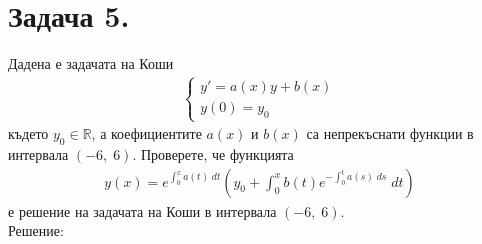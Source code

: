 \documentclass[a4paper, 12pt, oneside]{article}
\newcommand{\R}{\mathbb{R}}
\begin{document}
\section{Задача 5.}
Дадена е задачата на Коши
\begin{align*}
    \begin{cases}
        y' = a(x)y + b(x)\\
        y(0) = y_0
    \end{cases}
\end{align*}
където $y_0 \in \R$, а коефициентите $a(x)$ и $b(x)$ са непрекъснати функции в интервала $(-6, \; 6)$.
Проверете, че функцията 
\begin{align*}
    y(x) = e^{\displaystyle\int_0^x a(t) \; dt}\left(y_0 + \displaystyle\int_0^x b(t) e^{-\displaystyle\int_0^t a(s) \; ds} \; dt\right)
\end{align*}
е решение на задачата на Коши в интервала $(-6, \; 6)$. \\

Решение: \\
\end{document}
